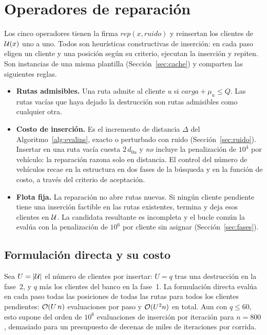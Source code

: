\section{Operadores de reparación}
\label{sec:reparacion}

Los cinco operadores tienen la firma $\textit{rep}(x,\textit{ruido})$ y reinsertan los
clientes de $\mathcal{U}(x)$ uno a uno. Todos son heurísticas constructivas de inserción: en cada
paso eligen un cliente y una posición según su criterio, ejecutan la inserción y repiten. Son
instancias de una misma plantilla (Sección~\ref{sec:cache}) y comparten las siguientes reglas.

\begin{itemize}
\item \textbf{Rutas admisibles.} Una ruta admite al cliente $u$ si
$\textit{carga}+\mu_u\le Q$. Las rutas vacías que haya dejado la destrucción son rutas
admisibles como cualquier otra.
\item \textbf{Costo de inserción.} Es el incremento de distancia $\Delta$ del
Algoritmo~\ref{alg:evalins}, exacto o perturbado con ruido (Sección~\ref{sec:ruido}). Insertar
en una ruta vacía cuesta $2\,d_{0u}$ y \emph{no} incluye la penalización de $10^4$ por
vehículo: la reparación razona solo en distancia. El control del número de vehículos recae en
la estructura en dos fases de la búsqueda y en la función de costo, a través del criterio de
aceptación.
\item \textbf{Flota fija.} La reparación no abre rutas nuevas. Si ningún cliente pendiente
tiene una inserción factible en las rutas existentes, termina y deja esos clientes en $\mathcal{U}$.
La candidata resultante es incompleta y el bucle común la evalúa con la penalización de $10^6$
por cliente sin asignar (Sección~\ref{sec:fases}).
\end{itemize}

\subsection{Formulación directa y su costo}

Sea $U=|\mathcal{U}|$ el número de clientes por insertar: $U=q$ tras una destrucción en la fase~2, y
$q$ más los clientes del banco en la fase~1. La formulación directa evalúa en cada paso todas
las posiciones de todas las rutas para todos los clientes pendientes: $\mathcal{O}(U\,n)$
evaluaciones por paso y $\mathcal{O}(U^2 n)$ en total. Aun con $q\le 60$, esto supone del orden de
$10^6$ evaluaciones de inserción por iteración para $n=800$, demasiado para un presupuesto de
decenas de miles de iteraciones por corrida.

